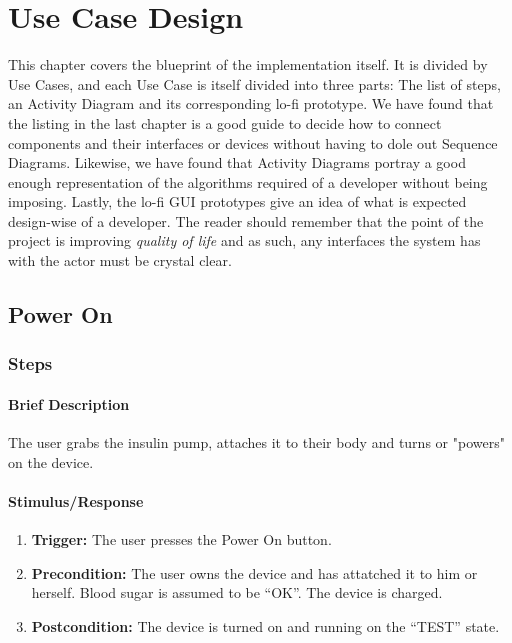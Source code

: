 \documentclass{scrreprt}
\begin{document}
\chapter{Use Case Design}
This chapter covers the blueprint of the implementation itself. It is divided by Use Cases, and each Use Case is itself divided into three parts: The list of steps, an Activity Diagram and its corresponding lo-fi 
prototype. We have found that the listing in the last chapter is a good guide to decide how to connect components and their interfaces or devices without having to dole out Sequence Diagrams. Likewise, we have found that
Activity Diagrams portray a good enough representation of the algorithms required of a developer without being imposing. Lastly, the lo-fi GUI prototypes give an idea of what is expected design-wise of a developer.  
The reader should remember that the point of the project is improving \textsl{quality of life} and as such, any interfaces the system has with the actor must be crystal clear.

\section{Power On}
\subsection{Steps}
    \subsubsection{Brief Description}
        The user grabs the insulin pump, attaches it to their body and turns or "powers" on the device.
    \subsubsection{Stimulus/Response}
    \begin{enumerate}
        \item \textbf{Trigger:} The user presses the Power On button.
        \item \textbf{Precondition:} The user owns the device and has attatched it to him or herself. Blood sugar is assumed to be “OK”. The device is charged.
        \item \textbf{Postcondition:} The device is turned on and running on the “TEST” state. 
    \end{enumerate}
\end{document}
